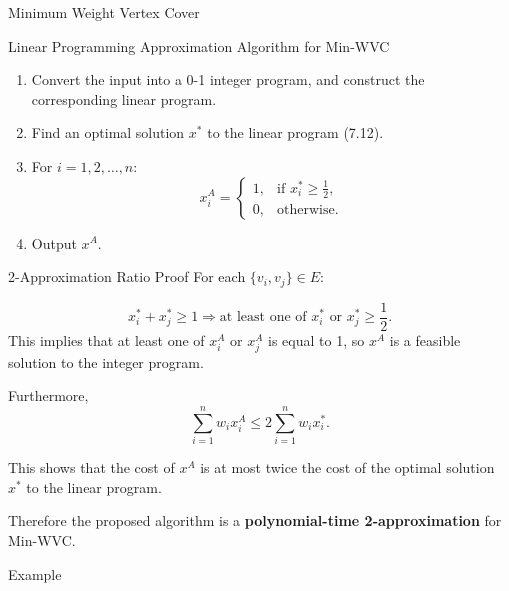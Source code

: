 \documentclass[xcolor=svgnames]{beamer}
\begin{document}
\begin{section}{Minimum Weight Vertex Cover}
\begin{frame}{Linear Programming Approximation Algorithm for Min-WVC}
        \begin{enumerate}
            \item Convert the input into a 0-1 integer program, and construct the corresponding linear program.
            \item Find an optimal solution \( x^* \) to the linear program (7.12).
            \item For \( i = 1, 2, \dots, n \):
            \[
            x^A_i = 
            \begin{cases} 
              1, & \text{if } x^*_i \geq \frac{1}{2}, \\ 
              0, & \text{otherwise.} 
            \end{cases}
            \]
            \item Output \( x^A \).
        \end{enumerate}
    \end{frame}

    \begin{frame}{2-Approximation Ratio Proof}
        For each \( \{v_i, v_j\} \in E \):
        
        \[
        x^*_i + x^*_j \geq 1 \Rightarrow \text{at least one of } x^*_i \text{ or } x^*_j \geq \frac{1}{2}.
        \]
        \pause
        This implies that at least one of \( x^A_i \) or \( x^A_j \) is equal to 1, so \( x^A \) is a feasible solution to the integer program.
        
        \vspace{0.3cm}
        \pause
        Furthermore,
        \[
        \sum_{i=1}^n w_i x^A_i \leq 2 \sum_{i=1}^n w_i x^*_i.
        \]
        
        This shows that the cost of \( x^A \) is at most twice the cost of the optimal solution \( x^* \) to the linear program.
        
        \vspace{0.3cm}
        \pause
        Therefore the proposed algorithm is a \textbf{polynomial-time 2-approximation} for Min-WVC.
    \end{frame}
    \begin{frame}{Example}
        \begin{minipage}
            {0.45\textwidth}
            \centering
\end{minipage}
\end{frame}
\end{section}
\end{document}
